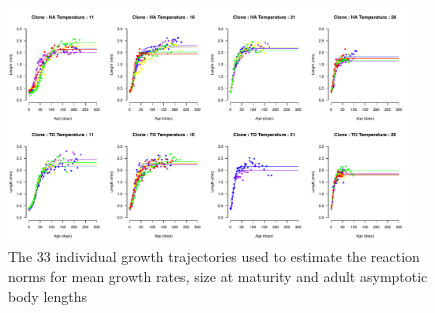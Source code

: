 \begin{figure}[!ht] %
\centering
\includegraphics[width=0.95\textwidth]{5_ChapExp3/fig/FigS1}
\caption[Individual growth trajectories]{
The 33 individual growth trajectories used to estimate the reaction norms for mean growth rates, size at maturity and adult asymptotic body lengths}
\label{Fig5-S1}
\end{figure}

\newpage


